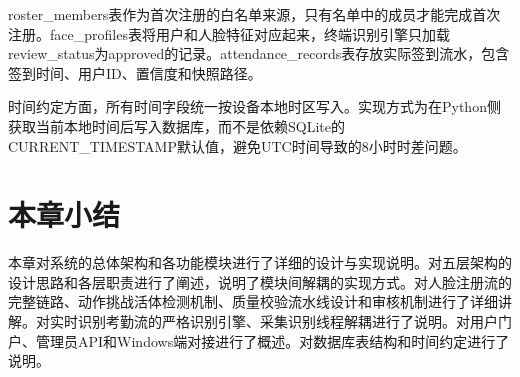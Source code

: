 roster\_members表作为首次注册的白名单来源，只有名单中的成员才能完成首次注册。face\_profiles表将用户和人脸特征对应起来，终端识别引擎只加载review\_status为approved的记录。attendance\_records表存放实际签到流水，包含签到时间、用户ID、置信度和快照路径。

时间约定方面，所有时间字段统一按设备本地时区写入。实现方式为在Python侧获取当前本地时间后写入数据库，而不是依赖SQLite的CURRENT\_TIMESTAMP默认值，避免UTC时间导致的8小时时差问题。

\section{本章小结}

本章对系统的总体架构和各功能模块进行了详细的设计与实现说明。对五层架构的设计思路和各层职责进行了阐述，说明了模块间解耦的实现方式。对人脸注册流的完整链路、动作挑战活体检测机制、质量校验流水线设计和审核机制进行了详细讲解。对实时识别考勤流的严格识别引擎、采集识别线程解耦进行了说明。对用户门户、管理员API和Windows端对接进行了概述。对数据库表结构和时间约定进行了说明。
